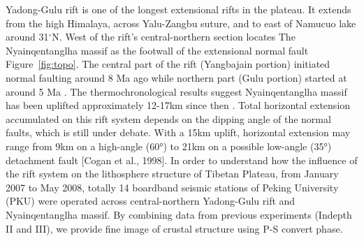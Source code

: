 
Yadong-Gulu rift is one of the longest extensional rifts in the plateau. It extends from the high Himalaya, across Yalu-Zangbu suture, and to east of Namucuo lake around 31$^\circ$N. West of the rift's central-northern section locates The Nyainqentanglha massif as the footwall of the extensional normal fault Figure~\ref{fig:topo}. 
The central part of the rift (Yangbajain portion) initiated normal faulting around 8 Ma ago while northern part (Gulu portion) started at around 5 Ma \cite{Harrison_1995,stockli2002late}. The thermochronological results suggest Nyainqentanglha massif has been uplifted approximately 12-17km since then \cite{Harrison_1995,Kapp_2005}. Total horizontal extension accumulated on this rift system depends on the dipping angle of the normal faults, which is still under debate. With a 15km uplift, horizontal extension may range from 9km on a high-angle (60°) to 21km on a possible low-angle (35°) detachment fault [Cogan et al., 1998]. 
In order to understand how the influence of the rift system on the lithosphere structure of Tibetan Plateau, from January 2007 to May 2008, totally 14 boardband seismic stations of Peking University (PKU) were operated across central-northern Yadong-Gulu rift and Nyainqentanglha massif. By combining data from previous experiments (Indepth II and III), we provide fine image of crustal structure using P-S convert phase.
